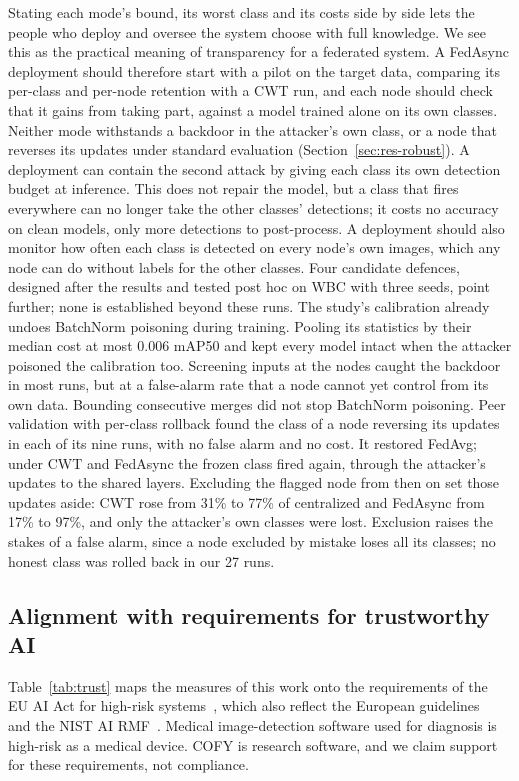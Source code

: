 \documentclass[pdflatex,sn-mathphys-num]{sn-jnl}
\newcommand{\sys}{COFY}
\begin{document}
Stating each mode's bound, its worst class and its costs side by side lets the people who deploy and oversee the system choose with full knowledge. We see this as the practical meaning of transparency for a federated system. A FedAsync deployment should therefore start with a pilot on the target data, comparing its per-class and per-node retention with a CWT run, and each node should check that it gains from taking part, against a model trained alone on its own classes. Neither mode withstands a backdoor in the attacker's own class, or a node that reverses its updates under standard evaluation (Section~\ref{sec:res-robust}). A deployment can contain the second attack by giving each class its own detection budget at inference. This does not repair the model, but a class that fires everywhere can no longer take the other classes' detections; it costs no accuracy on clean models, only more detections to post-process. A deployment should also monitor how often each class is detected on every node's own images, which any node can do without labels for the other classes. Four candidate defences, designed after the results and tested post hoc on WBC with three seeds, point further; none is established beyond these runs. The study's calibration already undoes BatchNorm poisoning during training. Pooling its statistics by their median cost at most 0.006 mAP50 and kept every model intact when the attacker poisoned the calibration too. Screening inputs at the nodes caught the backdoor in most runs, but at a false-alarm rate that a node cannot yet control from its own data. Bounding consecutive merges did not stop BatchNorm poisoning. Peer validation with per-class rollback found the class of a node reversing its updates in each of its nine runs, with no false alarm and no cost. It restored FedAvg; under CWT and FedAsync the frozen class fired again, through the attacker's updates to the shared layers. Excluding the flagged node from then on set those updates aside: CWT rose from 31\% to 77\% of centralized and FedAsync from 17\% to 97\%, and only the attacker's own classes were lost. Exclusion raises the stakes of a false alarm, since a node excluded by mistake loses all its classes; no honest class was rolled back in our 27 runs.

\subsection{Alignment with requirements for trustworthy AI}
Table~\ref{tab:trust} maps the measures of this work onto the requirements of the EU AI Act for high-risk systems~\cite{euaiact2024}, which also reflect the European guidelines~\cite{hleg2019ethics} and the NIST AI RMF~\cite{nist2023rmf}. Medical image-detection software used for diagnosis is high-risk as a medical device. \sys{} is research software, and we claim support for these requirements, not compliance.
\end{document}
